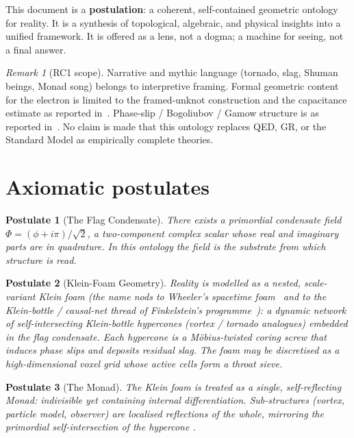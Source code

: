 \documentclass[11pt,a4paper]{article}
\newtheorem{postulate}{Postulate}[section]
\theoremstyle{definition}
\theoremstyle{remark}
\newtheorem{remark}{Remark}[section]
\begin{document}
This document is a \textbf{postulation}: a coherent, self-contained
geometric ontology for reality.  It is a synthesis of topological,
algebraic, and physical insights into a unified framework.  It is offered
as a lens, not a dogma; a machine for seeing, not a final answer.

\begin{remark}[RC1 scope]
Narrative and mythic language (tornado, slag, Shuman beings, Monad song)
belongs to interpretive framing.  Formal geometric content for the
electron is limited to the framed-unknot construction and the
capacitance estimate as reported in~\cite{Mobius2026}.  Phase-slip /
Bogoliubov / Gamow structure is as reported in~\cite{FlagDecay2026}.
No claim is made that this ontology replaces QED, GR, or the Standard
Model as empirically complete theories.
\end{remark}

\section{Axiomatic postulates}
\label{sec:axioms}

\begin{postulate}[The Flag Condensate]
There exists a primordial condensate field
$\Phi = (\phi + i\pi)/\sqrt{2}$, a two-component complex scalar whose
real and imaginary parts are in quadrature.  In this ontology the field
is the substrate from which structure is read.
\end{postulate}

\begin{postulate}[Klein-Foam Geometry]
Reality is modelled as a nested, scale-variant \emph{Klein foam}
(the name nods to Wheeler's spacetime foam~\cite{Wheeler} and to the
Klein-bottle / causal-net thread of Finkelstein's
programme~\cite{Finkelstein}): a
dynamic network of self-intersecting Klein-bottle hypercones
(vortex / tornado analogues) embedded in the flag condensate.  Each
hypercone is a M\"obius-twisted coring screw that induces phase slips
and deposits residual slag.  The foam may be discretised as a
high-dimensional voxel grid whose active cells form a throat sieve.
\end{postulate}

\begin{postulate}[The Monad]
The Klein foam is treated as a single, self-reflecting Monad: indivisible
yet containing internal differentiation.  Sub-structures (vortex,
particle model, observer) are localised reflections of the whole,
mirroring the primordial self-intersection of the hypercone
\cite{Leibniz}.
\end{postulate}
\end{document}
